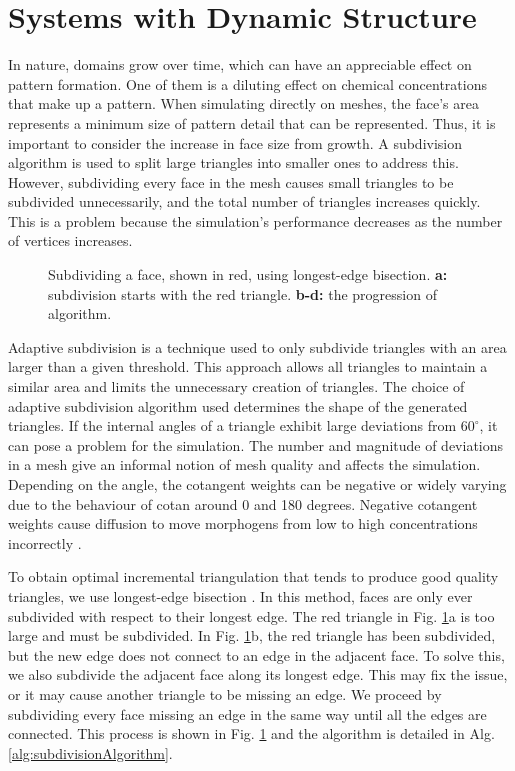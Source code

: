 \section{Systems with Dynamic Structure}
In nature, domains grow over time, which can have an appreciable effect on pattern formation. One of them is a diluting effect on chemical concentrations that make up a pattern. When simulating directly on meshes, the face's area represents a minimum size of pattern detail that can be represented. Thus, it is important to consider the increase in face size from growth. A subdivision algorithm is used to split large triangles into smaller ones to address this. However, subdividing every face in the mesh causes small triangles to be subdivided unnecessarily, and the total number of triangles increases quickly. This is a problem because the simulation's performance decreases as the number of vertices increases. 

\begin{figure}[H]
	\centering
	\caption[Subdividing a face, shown in red, using longest-edge bisection]{Subdividing a face, shown in red, using longest-edge bisection. \textbf{a:} subdivision starts with the red triangle. \textbf{b-d:} the progression of algorithm.} 
	\label{fig:recursiveSubdiv}
\end{figure}

Adaptive subdivision is a technique used to only subdivide triangles with an area larger than a given threshold. This approach allows all triangles to maintain a similar area and limits the unnecessary creation of triangles. The choice of adaptive subdivision algorithm used determines the shape of the generated triangles. If the internal angles of a triangle exhibit large deviations from $60^{\circ}$, it can pose a problem for the simulation. The number and magnitude of deviations in a mesh give an informal notion of mesh quality and affects the simulation. Depending on the angle, the cotangent weights can be negative or widely varying due to the behaviour of cotan around 0 and 180 degrees. Negative cotangent weights cause diffusion to move morphogens from low to high concentrations incorrectly \citep{wardetzky2007}. 

To obtain optimal incremental triangulation that tends to produce good quality triangles, we use longest-edge bisection \citep{rivara1998}. In this method, faces are only ever subdivided with respect to their longest edge. The red triangle in Fig. \ref{fig:recursiveSubdiv}a is too large and must be subdivided. In Fig. \ref{fig:recursiveSubdiv}b, the red triangle has been subdivided, but the new edge does not connect to an edge in the adjacent face. To solve this, we also subdivide the adjacent face along its longest edge. This may fix the issue, or it may cause another triangle to be missing an edge. We proceed by subdividing every face missing an edge in the same way until all the edges are connected. This process is shown in Fig. \ref{fig:recursiveSubdiv} and the algorithm is detailed in Alg. \ref{alg:subdivisionAlgorithm}. 

